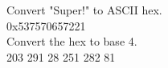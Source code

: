 \documentclass{article}
\begin{document}
\noindent Convert "Super!" to ASCII hex.\\
0x537570657221\\

\noindent Convert the hex to base 4.\\
203 291 28 251 282 81
\end{document}

